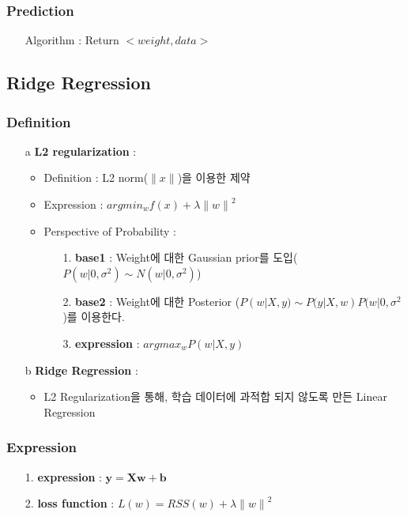 \documentclass{article}
\begin{document}
\subsubsection{Prediction}
\begin{itemize}
    \item[Algorithm] : Return $<weight, data>$ 
\end{itemize}

\subsection{Ridge Regression}
\subsubsection{Definition}
\begin{itemize}
    \item[a] \textbf{L2 regularization} : 
    \begin{itemize}
        \item Definition : L2 norm($\|x\|$)을 이용한 제약
        \item Expression : $argmin_w {f(x) +\lambda{ \| w \|}^2}$
        \item Perspective of Probability :
        \begin{itemize}
            \item[1.] \textbf{base1} : Weight에 대한 Gaussian prior를 도입($P(w|0,\sigma^2) \sim N(w|0,\sigma^2)$)
            \item[2.] \textbf{base2} : Weight에 대한 Posterior ($P(w|X,y) \sim P(y|X,w)P(w|0,\sigma^2$)를 이용한다.
            \item[3.] \textbf{expression} : $argmax_w P(w|X,y)$
        \end{itemize}
    \end{itemize}
    \item[b] \textbf{Ridge Regression} : 
        \begin{itemize}
            \item L2 Regularization을 통해, 학습 데이터에  과적합 되지 않도록 만든 Linear Regression
        \end{itemize}
\end{itemize}

\subsubsection{Expression}
\begin{itemize}
    \item[1.] \textbf{expression} : $\boldsymbol{y = Xw+b}$
    \item[2.] \textbf{loss function} : $L(w) = RSS(w) + \lambda{\|w\|}^2$
\end{itemize}
\end{document}
